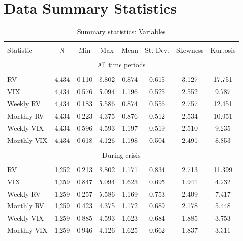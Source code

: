 \section*{Data Summary Statistics}
\begin{table}[!htbp] \centering 
  \caption{Summary statistics: Variables} 
  \label{tab:summary1} 
\begin{tabular}{@{\extracolsep{5pt}}lccccccc} 
\\[-1.8ex]\hline 
\hline \\[-1.8ex] 
Statistic & \multicolumn{1}{c}{N} & \multicolumn{1}{c}{Min} & \multicolumn{1}{c}{Max} & \multicolumn{1}{c}{Mean} & \multicolumn{1}{c}{St. Dev.} & \multicolumn{1}{c}{Skewness} & \multicolumn{1}{c}{Kurtosis} \\
\hline \\[-1.8ex] 
\multicolumn{8}{c}{All time periods} \\
\hline \\[-1.8ex] 
RV & 4,434 & 0.110 & 8.802 & 0.874 & 0.615 & 3.127 & 17.751 \\ 
VIX & 4,434 & 0.576 & 5.094 & 1.196 & 0.525 & 2.552 & 9.787 \\ 
Weekly RV & 4,434 & 0.183 & 5.586 & 0.874 & 0.556 & 2.757 & 12.451 \\ 
Monthly RV & 4,434 & 0.223 & 4.375 & 0.876 & 0.512 & 2.534 & 10.051\\ 
Weekly VIX & 4,434 & 0.596 & 4.593 & 1.197 & 0.519 & 2.510 & 9.235 \\ 
Monthly VIX & 4,434 & 0.618 & 4.126 & 1.198 & 0.504 & 2.491 & 8.853 \\ 
\hline \\[-1.8ex] 
\multicolumn{8}{c}{During crisis} \\
\hline \\[-1.8ex] 
RV & 1,252 & 0.213 & 8.802 & 1.171 & 0.834 & 2.713 & 11.399\\ 
VIX  & 1,259 & 0.847 & 5.094 & 1.623 & 0.695  & 1.941 &  4.232\\ 
Weekly RV & 1,259 & 0.257 & 5.586 & 1.169 & 0.753 & 2.409 & 7.417\\ 
Monthly RV & 1,259 & 0.423 & 4.375 & 1.172 & 0.689 & 2.178 & 5.448\\ 
Weekly VIX & 1,259 & 0.885 & 4.593 & 1.623 & 0.684  &  1.885 & 3.753\\ 
Monthly VIX & 1,259 & 0.946 & 4.126 & 1.625 & 0.662 & 1.837 & 3.311\\ 

\end{tabular}
\end{table}
